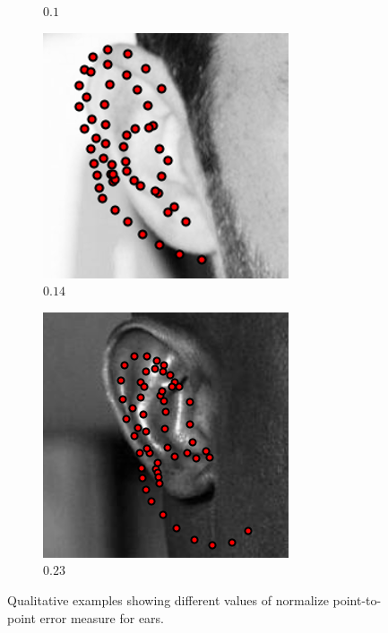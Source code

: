 \begin{figure}[h]
\begin{subfigure}[b]{0.23\textwidth}
    \caption{$0.1$}
    \end{subfigure}
    \begin{subfigure}[b]{0.23\textwidth}
            \includegraphics[height=1\textwidth]{resources/Fig_Alignment/ear_14_55}
    \caption{$0.14$}
    \end{subfigure}
    \begin{subfigure}[b]{0.23\textwidth}
            \includegraphics[height=1\textwidth]{resources/Fig_Alignment/ear_23_55}
    \caption{$0.23$}
    \end{subfigure}
\caption{Qualitative examples showing different values of normalize point-to-point error measure for ears.}
\label{fig:ear_error}
\end{figure}

